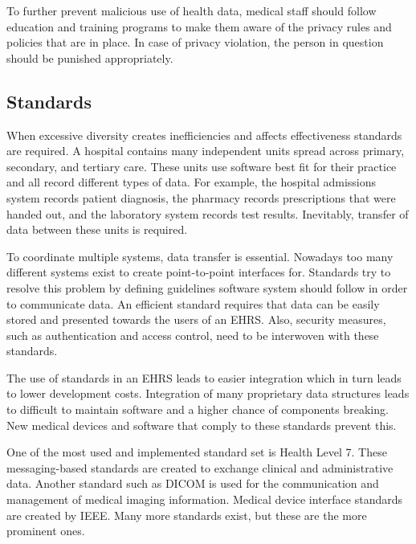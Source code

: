     To further prevent malicious use of health data, medical staff should follow education and training programs to make them aware of the privacy rules and policies that are in place. In case of privacy violation, the person in question should be punished appropriately.

    \subsection{Standards}\label{2_standards}

    When excessive diversity creates inefficiencies and affects effectiveness standards are required\cite{biomedical_informatics}. A hospital contains many independent units spread across primary, secondary, and tertiary care. These units use software best fit for their practice and all record different types of data. For example, the hospital admissions system records patient diagnosis, the pharmacy records prescriptions that were handed out, and the laboratory system records test results. Inevitably, transfer of data between these units is required. 

    To coordinate multiple systems, data transfer is essential. Nowadays too many different systems exist to create point-to-point interfaces for. Standards try to resolve this problem by defining guidelines software system should follow in order to communicate data. An efficient standard requires that data can be easily stored and presented towards the users of an EHRS\@. Also, security measures, such as authentication and access control, need to be interwoven with these standards.

    The use of standards in an EHRS leads to easier integration which in turn leads to lower development costs. Integration of many proprietary data structures leads to difficult to maintain software and a higher chance of components breaking. New medical devices and software that comply to these standards prevent this.

    One of the most used and implemented standard set is Health Level 7. These messaging-based standards are created to exchange clinical and administrative data. Another standard such as DICOM is used for the communication and management of medical imaging information\cite{mildenberger2002introduction}. Medical device interface standards are created by IEEE\@. Many more standards exist, but these are the more prominent ones.
